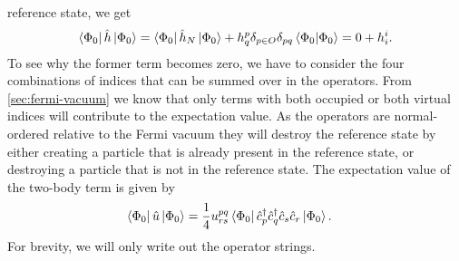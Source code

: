         reference state, we get
        \begin{align}
            \bra{\Phi_{0}}\hat{h}\ket{\Phi_{0}}
            =
            \bra{\Phi_{0}}\hat{h}_N\ket{\Phi_{0}}
            +
            h^{p}_{q}
            \delta_{p \in O}
            \delta_{pq}
            \braket{\Phi_{0}}{\Phi_{0}}
            = 0 + h^{i}_{i}.
        \end{align}
        To see why the former term becomes zero, we have to consider the four
        combinations of indices that can be summed over in the operators.
        From \autoref{sec:fermi-vacuum} we know that only terms with both
        occupied or both virtual indices will contribute to the expectation
        value.
        As the operators are normal-ordered relative to the Fermi vacuum they
        will destroy the reference state by either creating a particle that is
        already present in the reference state, or destroying a particle that is
        not in the reference state.
        The expectation value of the two-body term is given by
        \begin{align}
            \bra{\Phi_{0}}\hat{u}\ket{\Phi_{0}}
            &=
            \frac{1}{4}u^{pq}_{rs}
            \bra{\Phi_{0}}\hat{c}_{p}^{\dagger}\hat{c}_{q}^{\dagger}\hat{c}_{s}\hat{c}_{r}\ket{\Phi_{0}}.
        \end{align}
        For brevity, we will only write out the operator strings.
